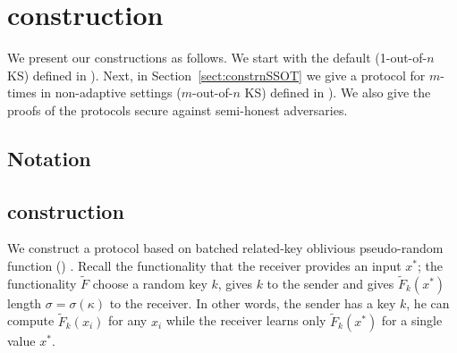 
\section{\OPPRF construction}

We present our constructions as follows.  We start with the default \OPPRF  (1-out-of-$n$ KS) defined in ).  Next, in Section~\ref{sect:constrnSSOT} we give a protocol for $m$-times  \OPPRF  in non-adaptive settings ($m$-out-of-$n$ KS) defined in ). We also give the proofs of the protocols secure against semi-honest adversaries.


\subsection{Notation}
\subsection{\OPPRF construction}
\label{sect:constr1SSOT}

We construct a \OPPRF protocol based on batched related-key oblivious pseudo-random function (\batchOPRF) \cite{CCS:KKRT16}. Recall the  \batchOPRF functionality that the receiver provides an input $x^*$; the functionality $\widetilde F$ choose a random key $k$, gives $k$ to the sender and gives $\widetilde F_k(x^*)$ length $\sigma=\sigma(\kappa)$ to the receiver. In other words, the sender has a key $k$, he can compute $\widetilde F_k(x_i)$ for any $x_i$ while the receiver learns only $\widetilde F_k(x^*)$ for a single value $x^*$. 

